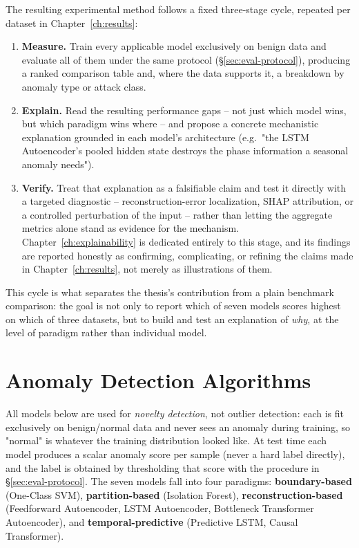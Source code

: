 The resulting experimental method follows a fixed three-stage cycle, repeated per dataset in Chapter~\ref{ch:results}:

\begin{enumerate}
  \item \textbf{Measure.} Train every applicable model exclusively on benign data and evaluate all of them under the same protocol (\S\ref{sec:eval-protocol}), producing a ranked comparison table and, where the data supports it, a breakdown by anomaly type or attack class.
  \item \textbf{Explain.} Read the resulting performance gaps -- not just which model wins, but which paradigm wins where -- and propose a concrete mechanistic explanation grounded in each model's architecture (e.g.\ "the LSTM Autoencoder's pooled hidden state destroys the phase information a seasonal anomaly needs").
  \item \textbf{Verify.} Treat that explanation as a falsifiable claim and test it directly with a targeted diagnostic -- reconstruction-error localization, SHAP attribution, or a controlled perturbation of the input -- rather than letting the aggregate metrics alone stand as evidence for the mechanism. Chapter~\ref{ch:explainability} is dedicated entirely to this stage, and its findings are reported honestly as confirming, complicating, or refining the claims made in Chapter~\ref{ch:results}, not merely as illustrations of them.
\end{enumerate}

This cycle is what separates the thesis's contribution from a plain benchmark comparison: the goal is not only to report which of seven models scores highest on which of three datasets, but to build and test an explanation of \emph{why}, at the level of paradigm rather than individual model.

\section{Anomaly Detection Algorithms}
\label{sec:algorithms}

All models below are used for \emph{novelty detection}, not outlier detection: each is fit exclusively on benign/normal data and never sees an anomaly during training, so "normal" is whatever the training distribution looked like. At test time each model produces a scalar anomaly score per sample (never a hard label directly), and the label is obtained by thresholding that score with the procedure in \S\ref{sec:eval-protocol}. The seven models fall into four paradigms: \textbf{boundary-based} (One-Class SVM), \textbf{partition-based} (Isolation Forest), \textbf{reconstruction-based} (Feedforward Autoencoder, LSTM Autoencoder, Bottleneck Transformer Autoencoder), and \textbf{temporal-predictive} (Predictive LSTM, Causal Transformer).

